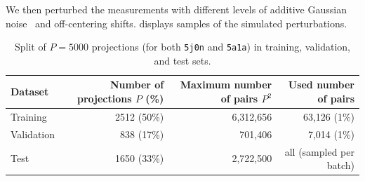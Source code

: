 We then perturbed the measurements with different levels of additive Gaussian noise~\cite{sorzano2004normalizing,shigematsu2013noise} and off-centering shifts. %
 displays samples of the simulated perturbations.

\begin{table}[ht!]
    \centering
    \begin{tabular}{lrrr}
        \toprule
        Dataset & Number of projections $P$ (\%) & Maximum number of pairs $P^2$ & Used number of pairs \\
        \midrule
        Training & 2512 (50\%) & 6,312,656 & 63,126 (1\%) \\
        Validation & 838 (17\%) & 701,406 & 7,014 (1\%) \\
        Test & 1650 (33\%) & 2,722,500 & all (sampled per batch) \\
        \bottomrule
    \end{tabular}
    \caption{%
        Split of $P=5000$ projections (for both \texttt{5j0n} and \texttt{5a1a}) in training, validation, and test sets.
    }\label{tab:dataset}
\end{table}

